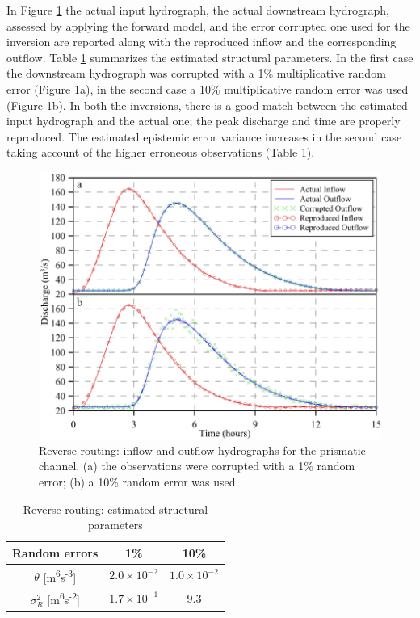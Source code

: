\documentclass[11pt,oneside,onecolumn]{usgsreport}
\begin{document}
\begin{appendix}
In Figure \ref{fig:Reverse-routing} the actual input hydrograph,
the actual downstream hydrograph, assessed by applying the forward
model, and the error corrupted one used for the inversion are reported
along with the reproduced inflow and the corresponding outflow. Table
\ref{tab:Reverse-routing} summarizes the estimated structural parameters.
In the first case the downstream hydrograph was corrupted with a 1\%
multiplicative random error (Figure \ref{fig:Reverse-routing}a),
in the second case a 10\% multiplicative random error was used (Figure
\ref{fig:Reverse-routing}b). In both the inversions, there is a good
match between the estimated input hydrograph and the actual one; the
peak discharge and time are properly reproduced. The estimated epistemic
error variance increases in the second case taking account of the
higher erroneous observations (Table \ref{tab:Reverse-routing}).

\begin{figure}[!t]
\noindent \begin{centering}
\includegraphics[scale=0.9]{figures/Reverse_Routing}
\par\end{centering}

\caption{\label{fig:Reverse-routing}Reverse routing: inflow and outflow hydrographs
for the prismatic channel. (a) the observations were corrupted with
a 1\% random error; (b) a 10\% random error was used.  }
\end{figure}


\begin{table}[!t]
\noindent \begin{centering}
\begin{tabular}{ccc}
\hline 
Random errors & 1\% & 10\%\tabularnewline
\hline 
$\theta$ {[}m\textsuperscript{6}s\textsuperscript{-3}{]} & $2.0\times10^{-2}$ & $1.0\times10^{-2}$\tabularnewline
\hline 
$\sigma_{R}^{2}$ {[}m\textsuperscript{6}s\textsuperscript{-2}{]} & $1.7\times10^{-1}$ & $9.3$\tabularnewline
\hline 
\end{tabular}
\par\end{centering}

\caption{\label{tab:Reverse-routing}Reverse routing: estimated structural
parameters  }
\end{table}
\end{appendix}
\end{document}
